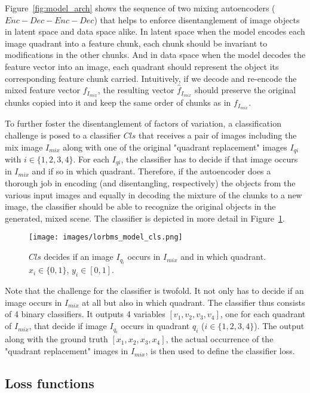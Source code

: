 \documentclass[12pt,a4paper]{article}
\begin{document}
Figure~\ref{fig:model_arch} shows the sequence of two mixing autoencoders ($Enc-Dec-Enc-Dec$) that helps to enforce disentanglement of image objects in latent space and data space alike. In latent space when the model encodes each image quadrant into a feature chunk, each chunk should be invariant to modifications in the other chunks. And in data space when the model decodes the feature vector into an image, each quadrant should represent the object its corresponding feature chunk carried. Intuitively, if we decode and re-encode the mixed feature vector $f_{I_{mix}}$, the resulting vector $\hat{f}_{I_{mix}}$ should preserve the original chunks copied into it and keep the same order of chunks as in $f_{I_{mix}}$.

To further foster the disentanglement of factors of variation, a classification challenge is posed to a classifier $Cls$ that receives a pair of images including the mix image $I_{mix}$ along with one of the original "quadrant replacement" images $I_{qi}$ with $i \in \{1,2,3,4\}$. For each $I_{qi}$, the classifier has to decide if that image occurs in $I_{mix}$ and if so in which quadrant. Therefore, if the autoencoder does a thorough job in encoding (and disentangling, respectively) the objects from the various input images and equally in decoding the mixture of the chunks to a new image, the classifier should be able to recognize the original objects in the generated, mixed scene. The classifier is depicted in more detail in Figure~\ref{fig:model_cls}.
\begin{figure}[ht]
\centering
\texttt{[image: images/lorbms\_model\_cls.png]}
\caption{$Cls$ decides if an image $I_{q_i}$ occurs in $I_{mix}$ and in which quadrant. $x_i \in \{0,1\}$, $y_i \in [0,1]$.}
\label{fig:model_cls}
\end{figure}
Note that the challenge for the classifier is twofold. It not only has to decide if an image occurs in $I_{mix}$ at all but also in which quadrant. The classifier thus consists of 4 binary classifiers. It outputs 4 variables $[v_1,v_2,v_3,v_4]$, one for each quadrant of $I_{mix}$, that decide if image $I_{q_i}$ occurs in quadrant $q_i$ ($i \in \{1,2,3,4\}$). The output along with the ground truth $[x_1,x_2,x_3,x_4]$, the actual occurrence of the "quadrant replacement" images in $I_{mix}$, is then used to define the classifier loss.

\subsection{Loss functions}
\end{document}

